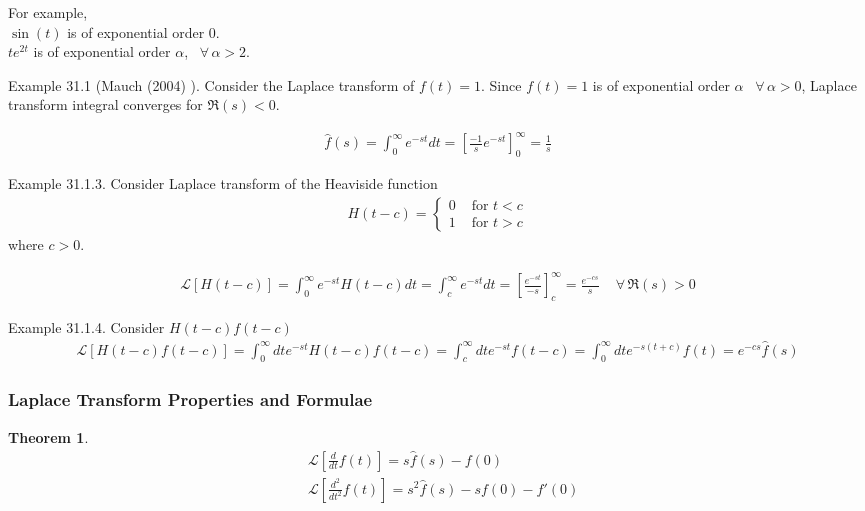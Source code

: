 \documentclass[10pt]{amsart}
\newtheorem{theorem}{Theorem}
\begin{document}
\begin{multicols*}{2}
For example, \\
$\sin{(t)}$ is of exponential order 0. \\
$te^{2t}$ is of exponential order $\alpha$, \, $\forall \, \alpha >2$.

Example 31.1 (Mauch (2004) \cite{Mauc2004}). Consider the Laplace transform of $f(t) = 1$.  Since $f(t)= 1$ is of exponential order $\alpha $ \, $\forall \, \alpha >0$, Laplace transform integral converges for $\Re{(s)} < 0$.

\[
\begin{gathered}
\widehat{f}(s) = \int_0^{\infty} e^{-st} dt = \left[ \frac{-1}{s} e^{-st} \right]_0^{\infty} = \frac{1}{s}
\end{gathered}
\]

Example 31.1.3. Consider Laplace transform of the Heaviside function
\[
\begin{gathered}
H(t-c) = \begin{cases}
0 & \text{ for } t < c \\
1 & \text{ for } t > c
\end{cases}
\end{gathered}
\]
where $c>0$.

\[
\begin{gathered}
\mathcal{L}[H(t-c)] = \int_0^{\infty} e^{-st} H(t-c) dt = \int_c^{\infty} e^{-st} dt = \left[ \frac{e^{-st}}{-s} \right]_c^{\infty} = \frac{e^{-cs}}{s} \quad \, \forall \, \Re{(s)} > 0
\end{gathered}
\]

Example 31.1.4. Consider $H(t-c) f(t-c)$
\[
\begin{gathered}
\mathcal{L}[H(t-c) f(t-c)] = \int_0^{\infty} dt e^{-st} H(t-c) f(t-c) = \int_c^{\infty} dt e^{-st} f(t-c) = \int_0^{\infty} dt e^{-s(t+c) } f(t) = e^{-cs} \widehat{f}(s)
\end{gathered}
\]

\subsubsection{Laplace Transform Properties and Formulae}

\begin{theorem}
\begin{equation}
\begin{aligned}
& \mathcal{L}\left[ \frac{d}{dt} f(t) \right] = s\widehat{f}(s) - f(0) \\
& \mathcal{L}\left[ \frac{d^2}{dt^2} f(t) \right] = s^2 \widehat{f}(s) - sf(0) - f'(0)
\end{aligned}
\end{equation}
\end{theorem}


\end{multicols*}
\end{document}
